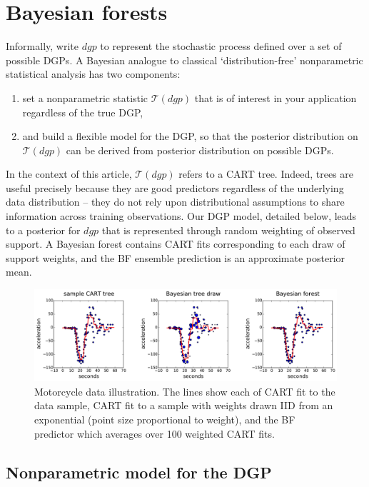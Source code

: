 \documentclass{article}
\begin{document}
\section{Bayesian forests}\label{bayesian-forests}

Informally, write $dgp$ to represent the stochastic process defined over a set of possible DGPs.
A Bayesian analogue to classical `distribution-free' nonparametric
statistical analysis \citep[e.g.,][]{hollander_nonparametric_1999} has two components:
\begin{enumerate}
\item set a nonparametric statistic $\mathcal{T}(dgp)$ that is of interest in your application regardless of the true DGP,
\item and build a flexible model for the DGP, so that the posterior distribution on $\mathcal{T}(dgp)$ can be derived from  posterior distribution on possible DGPs.
\end{enumerate}
In  the context of this article, $\mathcal{T}(dgp)$ refers to a CART tree.   Indeed, trees are useful precisely because they are good predictors regardless of the underlying data distribution -- they do not rely upon distributional assumptions to share information across training observations. 
Our DGP model, detailed below, leads to a posterior for $dgp$ that is represented through random weighting of observed support.  A Bayesian forest contains CART fits corresponding to each draw of support weights, and the BF ensemble prediction is an approximate posterior mean.



\begin{figure}
\includegraphics[width=\textwidth]{../graphs/mcycle}   
\caption{\label{mcycle} Motorcycle data illustration.  The lines show each of CART fit to the data sample, CART fit to a sample with weights drawn IID from an exponential (point size proportional to weight), and the BF predictor which averages over 100 weighted CART fits.} 
\end{figure}    

\subsection{Nonparametric model for the DGP}\label{dgpmodel}
\end{document}
